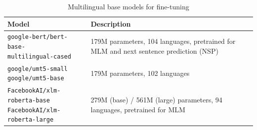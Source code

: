 \documentclass[11pt]{article}
\begin{document}
\begin{table}[h]
    \centering    
    \captionsetup{justification=centering, singlelinecheck=false}    \renewcommand{\arraystretch}{1.5}  %
       \begin{tabular}{|l|p{8.5cm}|}
        \hline
        \textbf{Model} & \textbf{Description} \\ \hline\hline
        \multicolumn{1}{|p{5.3cm}|}{\parbox[t]{6cm}{\texttt{google-bert/bert-base-\\multilingual-cased}}} & 179M parameters, 104 languages, pretrained for MLM and next sentence prediction (NSP) \cite{DBLP:journals/corr/abs-1810-04805} \\ \hline
        \multirow{2}{*}{\parbox[t]{6cm}{\texttt{google/umt5-small} \\ \texttt{google/umt5-base}}} & \multirow{2}{8.5cm}{179M parameters, 102 languages \cite{chung2023unimax}}\\ \cline{1-1}
        & \\ \hline
        \multirow{2}{*}{\parbox[t]{6cm}{\texttt{FacebookAI/xlm-roberta-base} \\ \texttt{FacebookAI/xlm-roberta-large}}} & \multirow{2}{8.5cm}{279M (base) / 561M (large) parameters, 94 languages, pretrained for MLM \cite{DBLP:journals/corr/abs-1911-02116}}\\ \cline{1-1}
        & \\ \hline
    \end{tabular}
    \caption{Multilingual base models for fine-tuning}
    \label{tab:multilingual_models}
\end{table}
\clearpage
\end{document}
